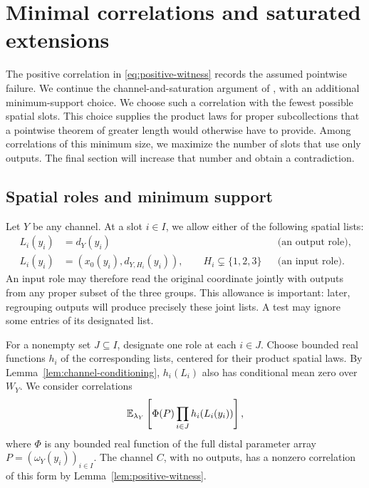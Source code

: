 \section{Minimal correlations and saturated extensions}
\label{sec:correlations}

The positive correlation in \eqref{eq:positive-witness} records the
assumed pointwise failure. We continue the channel-and-saturation
argument of \cite[Sections~5--6]{FourfoldCompanion}, with an additional
minimum-support choice. We choose such a correlation with the
fewest possible spatial slots. This choice supplies the product laws
for proper subcollections that a pointwise theorem of greater length
would otherwise have to provide. Among correlations of this minimum
size, we maximize the number of slots that use only outputs. The final
section will increase that number and obtain a contradiction.

\subsection{Spatial roles and minimum support}

Let $Y$ be any channel. At a slot $i\in I$, we allow either of the
following spatial lists:
\begin{align*}
 L_i(y_i)&=d_Y(y_i)
   &&\text{(an output role)},\\
 L_i(y_i)&=(x_0(y_i),d_{Y,H_i}(y_i)),\qquad
   H_i\subsetneq\{1,2,3\}
   &&\text{(an input role)}.
\end{align*}
An input role may therefore read the original coordinate jointly with
outputs from any proper subset of the three groups. This allowance is
important: later, regrouping outputs will produce precisely these
joint lists. A test may ignore some entries of its designated list.

For a nonempty set $J\subseteq I$, designate one role at each $i\in J$.
Choose bounded real functions $h_i$ of the corresponding lists, centered
for their product spatial laws. By Lemma~\ref{lem:channel-conditioning},
$h_i(L_i)$ also has conditional mean zero over $W_Y$. We consider
correlations
\begin{equation}
 \mathbb E_{\lambda_Y}\left[\Phi(P)
          \prod_{i\in J}h_i(L_i(y_i))\right],
 \label{eq:role-correlation}
\end{equation}
where $\Phi$ is any bounded real function of the full distal parameter
array $P=(\omega_Y(y_i))_{i\in I}$. The channel $C$, with no outputs,
has a nonzero correlation of this form by
Lemma~\ref{lem:positive-witness}.

